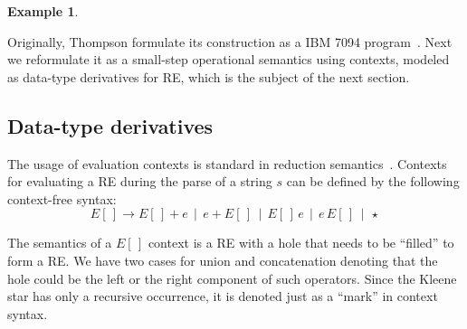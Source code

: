 \documentclass[oneside,12pt]{scrbook}
\theoremstyle{definition}
\newtheorem{Example}{Example}
\theoremstyle{plain}
\theoremstyle{definition}
\begin{document}
\begin{Example}
\begin{center}
	\end{center}
\end{Example}

Originally, Thompson formulate its construction as a IBM 7094 program~\cite{Thompson1968}. Next we reformulate it as a small-step
operational semantics using contexts, modeled as data-type derivatives for RE, which is the subject of
the next section.

\subsection{Data-type derivatives}

The usage of evaluation contexts is standard in reduction semantics~\cite{Felleisen2009}.
Contexts for evaluating a RE during the parse of a string $s$ can be defined by the following
context-free syntax:
\[E[\,] \to E[\,]+ e\,\mid\,e + E[\,]\,\mid\,E[\,]\,e\,\mid\,e\,E[\,]\,\mid\,\star\]

The semantics of a $E[\,]$ context is a RE with a hole that needs to be ``filled'' to form a
RE. We have two cases for union and concatenation denoting that the hole could be the left
or the right component of such operators. Since the Kleene star has only a recursive occurrence,
it is denoted just as a ``mark'' in context syntax.
\end{document}
